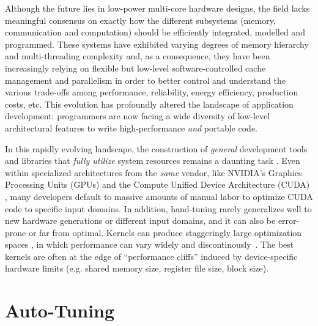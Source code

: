 \documentclass{sig-alternate}
\begin{document}

Although the future lies in low-power multi-core hardware designs, the field
lacks meaningful consensus on exactly how the different subsystems (memory,
communication and computation) should be efficiently integrated, modelled and
programmed. These systems have exhibited varying degrees of memory hierarchy
and multi-threading complexity and, as a consequence, they have been
increasingly relying on flexible but low-level software-controlled cache
management and parallelism \cite{BerkeleyViewOfHPC} in order to better control
and understand the various trade-offs among performance, reliability, energy
efficiency, production costs, etc. This evolution has profoundly altered the
landscape of application development: programmers are now facing a wide
diversity of low-level architectural features to write high-performance
\emph{and} portable code.


In this rapidly evolving landscape, the construction of \emph{general}
development tools and libraries that \emph{fully utilize} system resources
remains a daunting task \cite{?}. Even within specialized architectures from
the \emph{same} vendor, like NVIDIA's Graphics Processing Units (GPUs) and the
Compute Unified Device Architecture (CUDA) \cite{CUDA}, many developers default
to massive amounts of manual labor to optimize CUDA code to specific input
domains. In addition, hand-tuning rarely generalizes well to new hardware
generations or different input domains, and it can also be error-prone or far
from optimal. Kernels can produce staggeringly large
optimization spaces \cite{K. Datta et al. Stencil computation optimization and
auto-tuning on state-of-the-art multicore architectures}, in which performance can vary
widely and discontinously~\citep{RyooHwuCGO2008}.
The best kernels are often at the edge of ``performance cliffs'' induced by
device-specific hardware limits (e.g. shared memory size, register file size, block size).



\section{Auto-Tuning}

\end{document}
